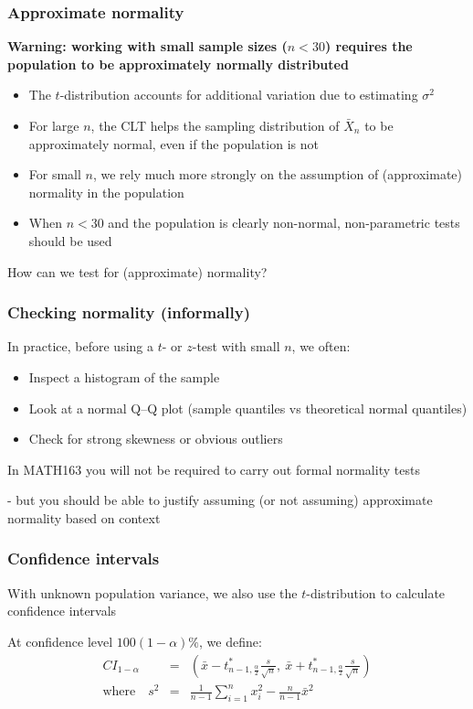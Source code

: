 \documentclass[t,8pt]{beamer}
\begin{document}
\begin{frame}
	\frametitle{Approximate normality}
	{\bf Warning: working with small sample sizes ($n<30$) requires the population to be approximately normally distributed} \par
	\begin{itemize}
		\item The $t$-distribution accounts for additional variation due to estimating $\sigma^2$ \par
		\item For large $n$, the CLT helps the sampling distribution of $\bar X_n$ to be approximately normal, even if the population is not
		\item For small $n$, we rely much more strongly on the assumption of (approximate) normality in the population
		\item When $n<30$ and the population is clearly non-normal, non-parametric tests should be used
	\end{itemize}
	How can we test for (approximate) normality?
\end{frame}

\begin{frame}
	\frametitle{Checking normality (informally)}
	In practice, before using a $t$- or $z$-test with small $n$, we often:
	\begin{itemize}
		\item Inspect a histogram of the sample
		\item Look at a normal Q–Q plot (sample quantiles vs theoretical normal quantiles)
		\item Check for strong skewness or obvious outliers
	\end{itemize}
	{\small\color{NavyBlue} In MATH163 you will not be required to carry out formal normality tests \par
		- but you should be able to justify assuming (or not assuming) approximate normality based on context}
\end{frame}

\begin{frame}
	\frametitle{Confidence intervals} 
	With unknown population variance, we also use the $t$-distribution to calculate confidence intervals \par
	At confidence level $100(1-\alpha)\%$, we define:
	\begin{eqnarray*}
		CI_{1-\alpha}&=&\left(\bar x-t^*_{n-1,\frac{\alpha}{2}}\frac s{\sqrt n},\ \bar x+t^*_{n-1,\frac{\alpha}{2}}\frac s{\sqrt n}\right) \\[4pt]
		\text{where}\quad s^2&=&\frac 1{n-1}\sum_{i=1}^nx_i^2-\frac n{n-1}\bar x^2
	\end{eqnarray*}
\end{frame}
\end{document}
